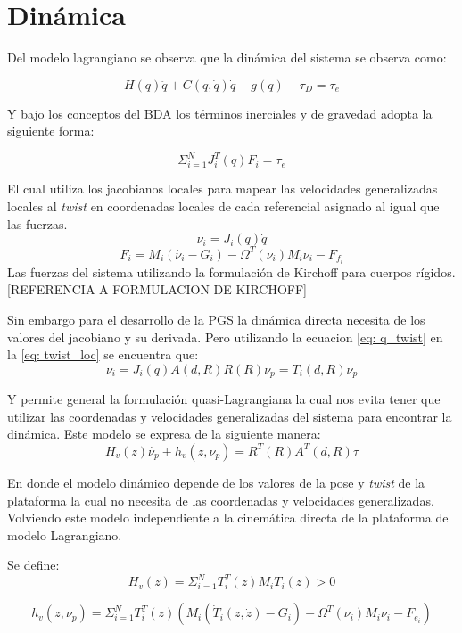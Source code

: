 \section{Dinámica}

Del modelo lagrangiano se observa que la dinámica del sistema se observa como:

\begin{equation}\label{eq: lagrangiano_modelo}
H(q)\ddot{q} + C(q,\dot{q})\dot{q} +g(q) - \tau_D = \tau_e
\end{equation}

Y bajo los conceptos del BDA los términos inerciales y de gravedad adopta la siguiente forma:

\begin{equation}
\Sigma_{i=1}^N J_i^T(q)F_i = \tau_e
\end{equation}

El cual utiliza los jacobianos locales para mapear las velocidades generalizadas locales al \emph{twist} en coordenadas locales de cada referencial asignado al igual que las fuerzas.
\begin{equation} \label{eq: twist_loc}
\nu_i = J_i(q)\dot{q}
\end{equation}
\begin{equation}
F_i = M_i(\dot{\nu_i} - G_i) - \Omega^T(\nu_i)M_i\nu_i - F_{f_{i}}
\end{equation}
Las fuerzas del sistema utilizando la formulación de Kirchoff para cuerpos rígidos.[REFERENCIA A FORMULACION DE KIRCHOFF]

Sin embargo para el desarrollo de la PGS la dinámica directa necesita de los valores del jacobiano y su derivada. Pero utilizando la ecuacion \ref{eq: q_twist} en la \ref{eq: twist_loc} se encuentra que:
\begin{equation}
\nu_i = J_i(q) A(d,R) R(R) \nu_p = T_i(d,R) \nu_p
\end{equation}

Y permite general la formulación quasi-Lagrangiana la cual nos evita tener que utilizar las coordenadas y velocidades generalizadas del sistema para encontrar la dinámica. Este modelo se expresa de la siguiente manera:
\begin{equation}
H_v(z)\dot{\nu_p}+h_v(z,\nu_p) = R^T(R) A^T(d,R)\tau
\end{equation}

En donde el modelo dinámico depende de los valores de la pose y \emph{twist} de la plataforma la cual no necesita de las coordenadas y velocidades generalizadas. Volviendo este modelo independiente a la cinemática directa de la plataforma del modelo Lagrangiano.

Se define:
\begin{equation}
H_v(z) = \Sigma_{i=1}^N T_i^T(z)M_iT_i(z) > 0
\end{equation}

\begin{equation}
h_v(z,\nu_p) = \Sigma_{i=1}^N T_i^T(z) \left( M_i\left(\dot{T}_i(z,\dot{z}) - G_i\right) - \Omega^T(\nu_i)M_i\nu_i - F_{e_{i}} \right)
\end{equation}
